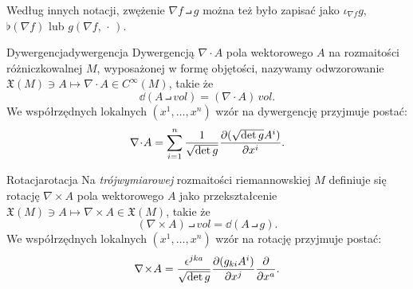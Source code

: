 \documentclass{article}
\newcommand\suni{\sum_{i=1}^{n}}
\begin{document}
Według innych notacji, zwężenie $\nabla{f}\intprod g$ można też było zapisać jako $\iota_{\nabla{f}} g$, $\flat(\nabla f)$ lub $g(\nabla f,\,\cdot\,)$.

\begin{dfn}{Dywergencja}{dywergencja}
  Dywergencją $\nabla\!\cdot\! A$ pola wektorowego $A$ na rozmaitości różniczkowalnej $M$, wyposażonej w formę objętości, nazywamy odwzorowanie $\mathfrak{X}(M)\ni A\mapsto \nabla\!\cdot\! A\in C^\infty(M)$, takie że
  \[
  \dd{(A\intprod vol)} = (\nabla\!\cdot\! A)\, vol.
  \]
  We współrzędnych lokalnych $(x^1,\ldots,x^n)$ wzór na dywergencję przyjmuje postać:
  \[
  \nabla\!\cdot\! A = \suni \frac{1}{\sqrt{\det g}} \pdv{(\sqrt{\det g} A^i)}{x^i}.
  \]
\end{dfn}

\begin{dfn}{Rotacja}{rotacja}
  Na \textit{trójwymiarowej} rozmaitości riemannowskiej $M$ definiuje się rotację $\nabla\!\times\!A$ pola wektorowego $A$ jako przekształcenie $\mathfrak{X}(M)\ni A\mapsto \nabla\!\times\! A\in \mathfrak{X}(M)$, takie że
  \[
  (\nabla\!\times\!A)\intprod vol = \dd{(A\intprod g)}.
  \]
  We współrzędnych lokalnych $(x^1,\ldots,x^n)$ wzór na rotację przyjmuje postać:
  \[
  \nabla\!\times\!A = \frac{\epsilon^{jka}}{\sqrt{\det g}}\pdv{(g_{ki} A^i)}{x^j}\pdv{x^a}.
  \]
\end{dfn}
\end{document}
